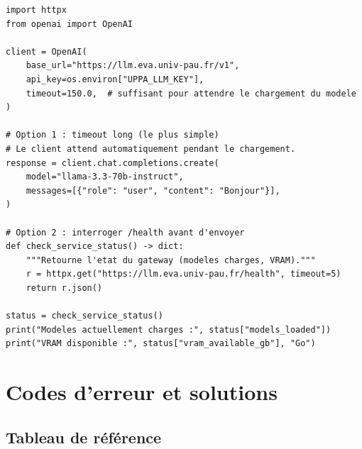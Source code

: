 \documentclass[12pt, a4paper, twoside]{article}
\begin{document}
\begin{lstlisting}[style=pythonstyle, caption={Deux approches pour gérer le délai de chargement}]
import httpx
from openai import OpenAI

client = OpenAI(
    base_url="https://llm.eva.univ-pau.fr/v1",
    api_key=os.environ["UPPA_LLM_KEY"],
    timeout=150.0,  # suffisant pour attendre le chargement du modele
)

# Option 1 : timeout long (le plus simple)
# Le client attend automatiquement pendant le chargement.
response = client.chat.completions.create(
    model="llama-3.3-70b-instruct",
    messages=[{"role": "user", "content": "Bonjour"}],
)

# Option 2 : interroger /health avant d'envoyer
def check_service_status() -> dict:
    """Retourne l'etat du gateway (modeles charges, VRAM)."""
    r = httpx.get("https://llm.eva.univ-pau.fr/health", timeout=5)
    return r.json()

status = check_service_status()
print("Modeles actuellement charges :", status["models_loaded"])
print("VRAM disponible :", status["vram_available_gb"], "Go")
\end{lstlisting}

\section{Codes d'erreur et solutions}
\label{sec:erreurs}

\subsection{Tableau de référence}
\end{document}
